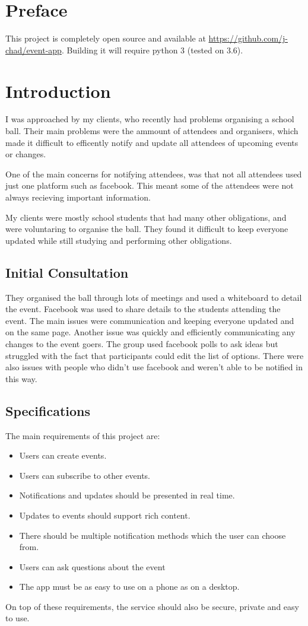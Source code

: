 \documentclass[12pt, draft]{report}
\begin{document}
	\tableofcontents
	\pagebreak

	\chapter{Preface}
	This project is completely open source and available at \url{https://github.com/j-chad/event-app}. Building it will require python 3 (tested on 3.6).

	\chapter{Introduction}
	I was approached by my clients, who recently had problems organising a school ball. Their main problems were the ammount of attendees and organisers, which made it difficult to efficently notify and update all attendees of upcoming events or changes.

	One of the main concerns for notifying attendees, was that not all attendees used just one platform such as facebook. This meant some of the attendees were not always recieving important information.

	My clients were mostly school students that had many other obligations, and were voluntaring to organise the ball. They found it difficult to keep everyone updated while still studying and performing other obligations.

	\section{Initial Consultation}
	They organised the ball through lots of meetings and used a whiteboard to detail the event. Facebook was used to share details to the students attending the event. The main issues were communication and keeping everyone updated and on the same page. Another issue was quickly and efficiently communicating any changes to the event goers. The group used facebook polls to ask ideas but struggled with the fact that participants could edit the list of options. There were also issues with people who didn’t use facebook and weren’t able to be notified in this way.

	\section{Specifications}
	The main requirements of this project are:
	\begin{itemize}
		\item Users can create events.
		\item Users can subscribe to other events.
		\item Notifications and updates should be presented in real time.
		\item Updates to events should support rich content.
		\item There should be multiple notification methods which the user can choose from.
		\item Users can ask questions about the event
		\item The app must be as easy to use on a phone as on a desktop.
	\end{itemize}
	On top of these requirements, the service should also be secure, private and easy to use.
\end{document}
